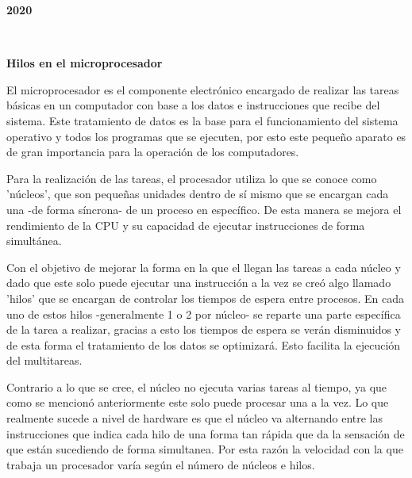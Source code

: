 \documentclass{article}
\begin{document}
\begin{center}
\bf{\sc\Large 2020}\\
\end{center}\
\newpage
\begin{center}
\bf{\sc\LARGE Hilos en el microprocesador}\\
\end{center}
\vspace{50pt}
\Large 
El microprocesador es el componente electrónico encargado de realizar las tareas básicas en un computador con base a los datos e instrucciones que recibe del sistema. Este tratamiento de datos es la base para el funcionamiento del sistema operativo y todos los programas que se ejecuten, por esto este pequeño aparato es de gran importancia para la operación de los computadores.

\vspace{15pt}
Para la realización de las tareas, el procesador utiliza lo que se conoce como 'núcleos', que son pequeñas unidades dentro de sí mismo que se encargan cada una -de forma síncrona- de un proceso en específico. De esta manera se mejora el rendimiento de la CPU y su capacidad de ejecutar instrucciones de forma simultánea.

\vspace{15pt}
 Con el objetivo de mejorar la forma en la que el llegan las tareas a cada núcleo y dado que este solo puede ejecutar una instrucción a la vez se creó algo llamado 'hilos' que se encargan de controlar los tiempos de espera entre procesos. En cada uno de estos hilos -generalmente 1 o 2 por núcleo- se reparte una parte específica de la tarea a realizar, gracias a esto los tiempos de espera se verán disminuidos y de esta forma el tratamiento de los datos se optimizará. Esto facilita la ejecución del multitareas.
 
\vspace{15pt}
Contrario a lo que se cree, el núcleo no ejecuta varias tareas al tiempo, ya que como se mencionó anteriormente este solo puede procesar una a la vez. Lo que realmente sucede a nivel de hardware es que el núcleo va alternando entre las instrucciones que indica cada hilo de una forma tan rápida que da la sensación de que están sucediendo de forma simultanea. Por esta razón la velocidad con la que trabaja un procesador varía según el número de núcleos e hilos.
\end{document}

